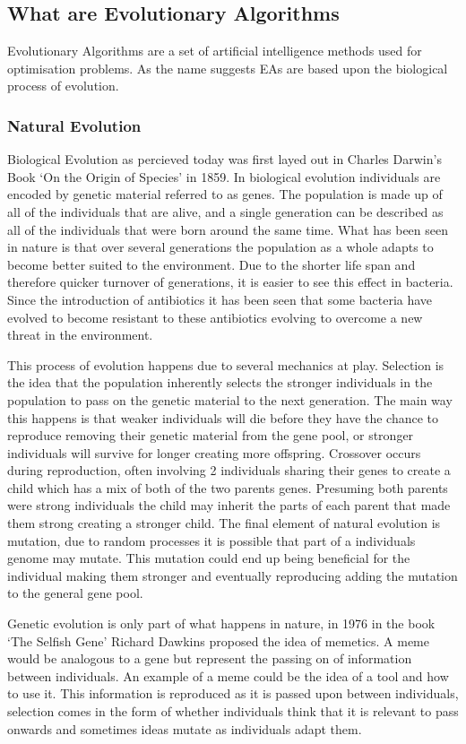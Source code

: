 \documentclass[a4paper]{article}
\begin{document}
\subsection{What are Evolutionary Algorithms}
Evolutionary Algorithms are a set of artificial intelligence methods used for optimisation problems.
As the name suggests EAs are based upon the biological process of evolution.
\subsubsection{Natural Evolution}
Biological Evolution as percieved today was first layed out in Charles Darwin's Book `On the Origin of Species' in 1859.
In biological evolution individuals are encoded by genetic material referred to as genes.
The population is made up of all of the individuals that are alive, and a single generation can be described as all of the individuals that were born around the same time.
What has been seen in nature is that over several generations the population as a whole adapts to become better suited to the environment.
Due to the shorter life span and therefore quicker turnover of generations, it is easier to see this effect in bacteria.
Since the introduction of antibiotics it has been seen that some bacteria have evolved to become resistant to these antibiotics evolving to overcome a new threat in the environment.
\par
This process of evolution happens due to several mechanics at play.
Selection is the idea that the population inherently selects the stronger individuals in the population to pass on the genetic material to the next generation.
The main way this happens is that weaker individuals will die before they have the chance to reproduce removing their genetic material from the gene pool, or stronger individuals will survive for longer creating more offspring.
Crossover occurs during reproduction, often involving 2 individuals sharing their genes to create a child which has a mix of both of the two parents genes.
Presuming both parents were strong individuals the child may inherit the parts of each parent that made them strong creating a stronger child.
The final element of natural evolution is mutation, due to random processes it is possible that part of a individuals genome may mutate.
This mutation could end up being beneficial for the individual making them stronger and eventually reproducing adding the mutation to the general gene pool.
\par
Genetic evolution is only part of what happens in nature, in 1976 in the book `The Selfish Gene' Richard Dawkins proposed the idea of memetics.
A meme would be analogous to a gene but represent the passing on of information between individuals.
An example of a meme could be the idea of a tool and how to use it.
This information is reproduced as it is passed upon between individuals, selection comes in the form of whether individuals think that it is relevant to pass onwards and sometimes ideas mutate as individuals adapt them.
\end{document}
